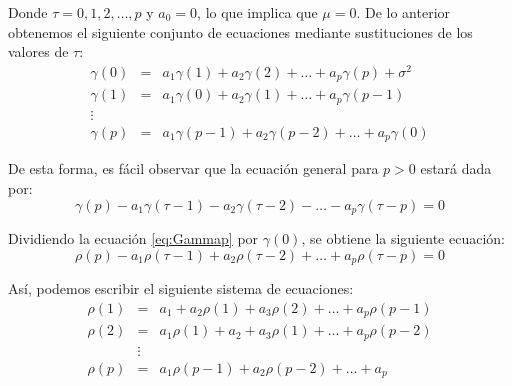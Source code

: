 \documentclass[
]{book}
\begin{document}
Donde \(\tau = 0, 1, 2, \ldots, p\) y \(a_0 = 0\), lo que implica que \(\mu = 0\). De lo anterior obtenemos el siguiente conjunto de ecuaciones mediante sustituciones de los valores de \(\tau\):
\begin{eqnarray}
    \gamma(0) & = & a_1 \gamma(1) + a_2 \gamma(2) + \ldots + a_p \gamma(p) + \sigma^2 \nonumber \\
    \gamma(1) & = & a_1 \gamma(0) + a_2 \gamma(1) + \ldots + a_p \gamma(p-1) \nonumber \\
    \vdots \nonumber \\
    \gamma(p) & = & a_1 \gamma(p-1) + a_2 \gamma(p-2) + \ldots + a_p \gamma(0) \nonumber
\end{eqnarray}

De esta forma, es fácil observar que la ecuación general para \(p > 0\) estará dada por:
\begin{equation}
    \gamma(p) - a_1 \gamma(\tau - 1) - a_2 \gamma(\tau - 2) - \ldots - a_p \gamma(\tau - p) = 0
    \label{eq:Gammap}
\end{equation}

Dividiendo la ecuación \eqref{eq:Gammap} por \(\gamma(0)\), se obtiene la siguiente ecuación:
\begin{equation}
    \rho(p) - a_1 \rho(\tau - 1) + a_2 \rho(\tau - 2) + \ldots + a_p \rho(\tau - p) = 0
\end{equation}

Así, podemos escribir el siguiente sistema de ecuaciones:
\begin{eqnarray}
    \rho(1) & = & a_1 + a_2 \rho(1) + a_3 \rho(2) + \ldots + a_p \rho(p-1) \nonumber \\
    \rho(2) & = & a_1 \rho(1) + a_2 + a_3 \rho(1) + \ldots + a_p \rho(p-2) \nonumber \\
    & \vdots & \nonumber \\
    \rho(p) & = & a_1 \rho(p-1) + a_2 \rho(p-2) + \ldots + a_p \nonumber
\end{eqnarray}
\end{document}

